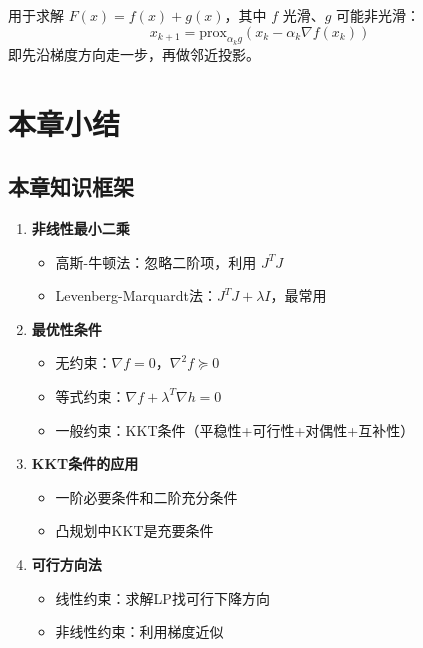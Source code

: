 \begin{algobox}
用于求解 $F(x) = f(x) + g(x)$，其中 $f$ 光滑、$g$ 可能非光滑：
\[
x_{k+1} = \text{prox}_{\alpha_k g}\left(x_k - \alpha_k \nabla f(x_k)\right)
\]
即先沿梯度方向走一步，再做邻近投影。
\end{algobox}

\section{本章小结}\label{sec:ch7-summary}

\subsection{本章知识框架}

\begin{conceptbox}
\begin{enumerate}[label=\arabic*., leftmargin=2em]
    \item \textbf{非线性最小二乘}
    \begin{itemize}
        \item 高斯-牛顿法：忽略二阶项，利用 $J^T J$
        \item Levenberg-Marquardt法：$J^T J + \lambda I$，最常用
    \end{itemize}
    \item \textbf{最优性条件}
    \begin{itemize}
        \item 无约束：$\nabla f = 0$，$\nabla^2 f \succeq 0$
        \item 等式约束：$\nabla f + \lambda^T \nabla h = 0$
        \item 一般约束：KKT条件（平稳性+可行性+对偶性+互补性）
    \end{itemize}
    \item \textbf{KKT条件的应用}
    \begin{itemize}
        \item 一阶必要条件和二阶充分条件
        \item 凸规划中KKT是充要条件
    \end{itemize}
    \item \textbf{可行方向法}
    \begin{itemize}
        \item 线性约束：求解LP找可行下降方向
        \item 非线性约束：利用梯度近似
    \end{itemize}

\end{enumerate}
\end{conceptbox}
